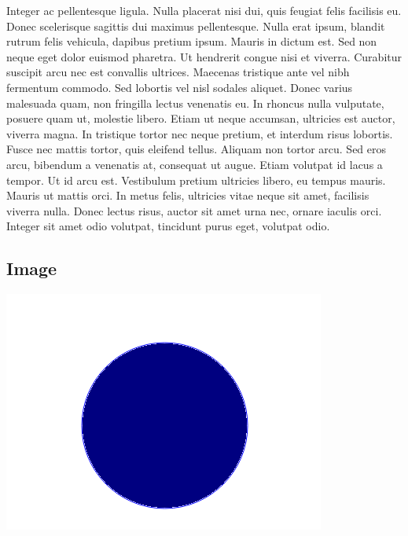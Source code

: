 \documentclass[a4paper]{article}
\begin{document}
\begin{multicols}{5}
		Integer ac pellentesque ligula. Nulla placerat nisi dui, quis feugiat felis facilisis eu. Donec scelerisque sagittis dui maximus pellentesque. Nulla erat ipsum, blandit rutrum felis vehicula, dapibus pretium ipsum. Mauris in dictum est. Sed non neque eget dolor euismod pharetra. Ut hendrerit congue nisi et viverra. Curabitur suscipit arcu nec est convallis ultrices. Maecenas tristique ante vel nibh fermentum commodo.
		Sed lobortis vel nisl sodales aliquet. Donec varius malesuada quam, non fringilla lectus venenatis eu. In rhoncus nulla vulputate, posuere quam ut, molestie libero. Etiam ut neque accumsan, ultricies est auctor, viverra magna. In tristique tortor nec neque pretium, et interdum risus lobortis. Fusce nec mattis tortor, quis eleifend tellus. Aliquam non tortor arcu. Sed eros arcu, bibendum a venenatis at, consequat ut augue. Etiam volutpat id lacus a tempor. Ut id arcu est. Vestibulum pretium ultricies libero, eu tempus mauris. Mauris ut mattis orci. In metus felis, ultricies vitae neque sit amet, facilisis viverra nulla. Donec lectus risus, auctor sit amet urna nec, ornare iaculis orci. Integer sit amet odio volutpat, tincidunt purus eget, volutpat odio.
    \end{multicols}
    \begin{landscape}
    \section{Image}
    	\includegraphics[width=\textwidth]{test.png}
    \end{landscape}
    
\end{document}
